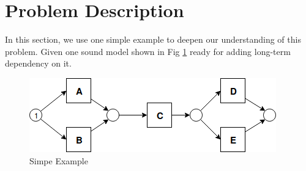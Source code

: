 \documentclass[]{article}
\begin{document}
\section{Problem Description}
In this section, we use one simple example to deepen our understanding of this problem. 
Given one sound model shown in Fig \ref{fig:seq-2-xor-model} ready for adding long-term dependency on it. 
\begin{figure}[!h]
	\includegraphics[width=\textwidth]{LT_Seq_01_Original.png}
	\caption{Simpe Example}
	\label{fig:seq-2-xor-model}
\end{figure}
\end{document}
